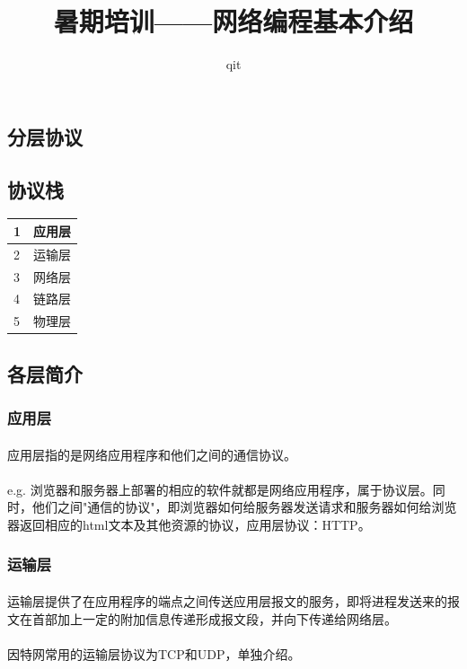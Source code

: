 \documentclass[12pt]{article}
\author{qit}
\title{暑期培训——网络编程基本介绍}
\begin{document}
\begin{CJK}{UTF8}{gbsn}
\maketitle

\section{分层协议}
\subsection{协议栈}
\begin{tabular}{lr}
\hline
1&应用层\\ 
\hline
2&运输层\\
\hline
3&网络层\\
\hline
4&链路层\\
\hline
5&物理层\\
\hline
\end{tabular}

\subsection{各层简介}
\subsubsection{应用层}
\paragraph{}应用层指的是网络应用程序和他们之间的通信协议。
\paragraph{}e.g. 浏览器和服务器上部署的相应的软件就都是网络应用程序，属于协议层。同时，他们之间"通信的协议"，即浏览器如何给服务器发送请求和服务器如何给浏览器返回相应的html文本及其他资源的协议，应用层协议：HTTP。

\subsubsection{运输层}
\paragraph{}运输层提供了在应用程序的端点之间传送应用层报文的服务，即将进程发送来的报文在首部加上一定的附加信息传递形成报文段，并向下传递给网络层。
\paragraph{}因特网常用的运输层协议为TCP和UDP，单独介绍。


\end{CJK}
\end{document}
